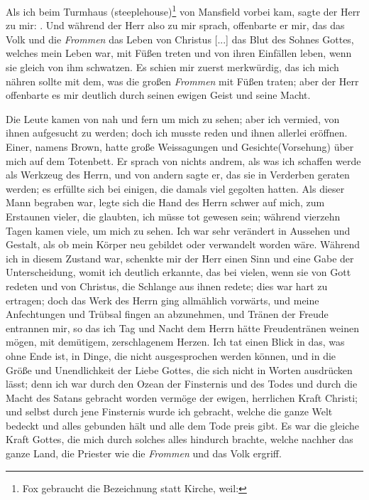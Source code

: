 Als ich beim Turmhaus (steeplehouse)\footnote{Fox gebraucht 
die Bezeichnung  statt Kirche, weil: } von Mansfield vorbei kam, sagte 
der Herr zu mir: . Und während der Herr also
zu mir sprach, offenbarte er mir, das das Volk und die \textit{Frommen}
das Leben von Christus [...] das Blut des Sohnes Gottes, welches
mein Leben war, mit Füßen treten und von ihren Einfällen leben,
wenn sie gleich von ihm schwatzen. Es schien mir zuerst 
merkwürdig, das ich mich nähren sollte mit dem, was die großen
\textit{Frommen} mit Füßen traten; aber der Herr offenbarte es mir
deutlich durch seinen ewigen Geist und seine Macht.

Die Leute kamen von nah und fern um mich zu sehen;
aber ich vermied, von ihnen aufgesucht zu werden; doch ich musste
reden und ihnen allerlei eröffnen. Einer, namens Brown, hatte
große Weissagungen und Gesichte(Vorsehung) über mich auf dem Totenbett.
Er sprach von nichts andrem, als was ich schaffen werde als
Werkzeug des Herrn, und von andern sagte er, das sie in 
Verderben geraten werden; es erfüllte sich bei einigen, die damals
viel gegolten hatten. Als dieser Mann begraben war, legte sich
die Hand des Herrn schwer auf mich, zum Erstaunen vieler, die
glaubten, ich müsse tot gewesen sein; während vierzehn Tagen
kamen viele, um mich zu sehen. Ich war sehr verändert in 
Aussehen und Gestalt, als ob mein Körper neu gebildet oder 
verwandelt worden wäre. Während ich in diesem Zustand war,
schenkte mir der Herr einen Sinn und eine Gabe der 
Unterscheidung, womit ich deutlich erkannte, das bei vielen, wenn sie
von Gott redeten und von Christus, die Schlange aus ihnen redete;
dies war hart zu ertragen; doch das Werk des Herrn ging 
allmählich vorwärts, und meine Anfechtungen und Trübsal fingen
an abzunehmen, und Tränen der Freude entrannen mir, so das
ich Tag und Nacht dem Herrn hätte Freudentränen weinen mögen,
mit demütigem, zerschlagenem Herzen. Ich tat einen Blick in das,
was ohne Ende ist, in Dinge, die nicht ausgesprochen werden
können, und in die Größe und Unendlichkeit der Liebe Gottes,
die sich nicht in Worten ausdrücken lässt; denn ich war durch
den Ozean der Finsternis und des Todes und durch die Macht
des Satans gebracht worden vermöge der ewigen, herrlichen Kraft
Christi; und selbst durch jene Finsternis wurde ich gebracht, welche
die ganze Welt bedeckt und alles gebunden hält und alle dem Tode
preis gibt. Es war die gleiche Kraft Gottes, die mich durch
solches alles hindurch brachte, welche nachher das ganze Land,
die Priester wie die \textit{Frommen} und das Volk ergriff.

